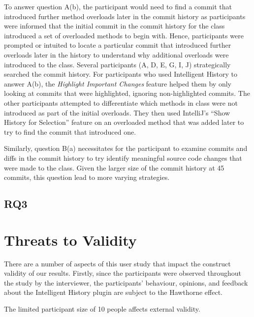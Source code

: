 To answer question A(b), the participant would need to find a commit that introduced further  method overloads later in the commit history as participants were informed that the initial commit in the commit history for the  class introduced a set of overloaded  methods to begin with.
Hence, participants were prompted or intuited to locate a particular commit that introduced further overloads later in the history to understand why additional  overloads were introduced to the  class.
Several participants (A, D, E, G, I, J) strategically searched the commit history.
For participants who used Intelligent History to answer A(b), the \textit{Highlight Important Changes} feature helped them by only looking at commits that were highlighted, ignoring non-highlighted commits.
The other participants attempted to differentiate which  methods in class were not introduced as part of the initial overloads.
They then used IntelliJ's ``Show History for Selection'' feature on an  overloaded method that was added later to try to find the commit that introduced one.

Similarly, question B(a) necessitates for the participant to examine commits and diffs in the  commit history to try identify meaningful source code changes that were made to the class.
Given the larger size of the  commit history at 45 commits, this question lead to more varying strategies.

\subsection{RQ3}


\section{Threats to Validity}
\label{sec:Threads-to-Validity}

There are a number of aspects of this user study that impact the construct validity of our results.
Firstly, since the participants were observed throughout the study by the interviewer, the participants' behaviour, opinions, and feedback about the Intelligent History plugin are subject to the Hawthorne effect.

The limited participant size of 10 people affects external validity.


\endinput

Any text after an \endinput is ignored.
You could put scraps here or things in progress.